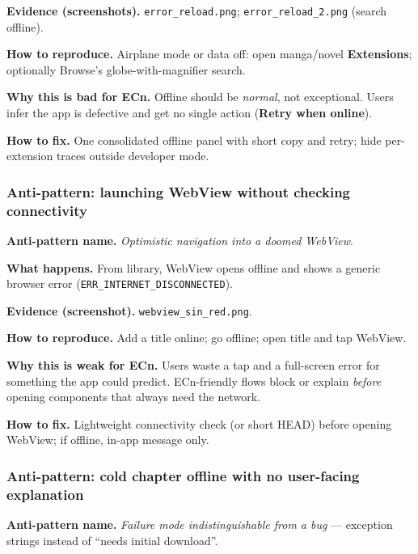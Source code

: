 \textbf{Evidence (screenshots).} \texttt{error\_reload.png}; \texttt{error\_reload\_2.png} (search offline).


\textbf{How to reproduce.} Airplane mode or data off: open manga/novel \textbf{Extensions}; optionally Browse's globe-with-magnifier search.

\textbf{Why this is bad for ECn.} Offline should be \emph{normal}, not exceptional. Users infer the app is defective and get no single action (\textbf{Retry when online}).

\textbf{How to fix.} One consolidated offline panel with short copy and retry; hide per-extension traces outside developer mode.

\subsubsection{Anti-pattern: launching WebView without checking connectivity}
\label{sec:ecn-ap-webview}
\textbf{Anti-pattern name.} \emph{Optimistic navigation into a doomed WebView}.

\textbf{What happens.} From library, WebView opens offline and shows a generic browser error (\texttt{ERR\_INTERNET\_DISCONNECTED}).

\textbf{Evidence (screenshot).} \texttt{webview\_sin\_red.png}.


\textbf{How to reproduce.} Add a title online; go offline; open title and tap WebView.

\textbf{Why this is weak for ECn.} Users waste a tap and a full-screen error for something the app could predict. ECn-friendly flows block or explain \emph{before} opening components that always need the network.

\textbf{How to fix.} Lightweight connectivity check (or short HEAD) before opening WebView; if offline, in-app message only.

\subsubsection{Anti-pattern: cold chapter offline with no user-facing explanation}
\label{sec:ecn-ap-cold}
\textbf{Anti-pattern name.} \emph{Failure mode indistinguishable from a bug} --- exception strings instead of ``needs initial download''.

